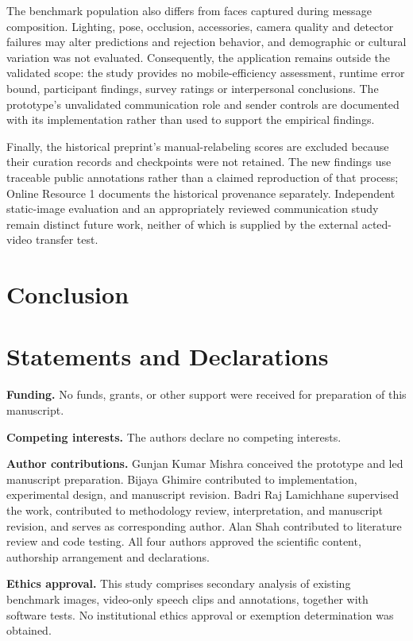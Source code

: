 \documentclass[pdflatex,sn-mathphys-num]{sn-jnl}
\begin{document}
The benchmark population also differs from faces captured during message composition. Lighting, pose, occlusion, accessories, camera quality and detector failures may alter predictions and rejection behavior, and demographic or cultural variation was not evaluated. Consequently, the application remains outside the validated scope: the study provides no mobile-efficiency assessment, runtime error bound, participant findings, survey ratings or interpersonal conclusions. The prototype's unvalidated communication role and sender controls are documented with its implementation rather than used to support the empirical findings.

Finally, the historical preprint's manual-relabeling scores are excluded because their curation records and checkpoints were not retained. The new findings use traceable public annotations rather than a claimed reproduction of that process; Online Resource 1 documents the historical provenance separately. Independent static-image evaluation and an appropriately reviewed communication study remain distinct future work, neither of which is supplied by the external acted-video transfer test.

\section{Conclusion}



\backmatter
\section*{Statements and Declarations}
\noindent\textbf{Funding.} No funds, grants, or other support were received for preparation of this manuscript.

\noindent\textbf{Competing interests.} The authors declare no competing interests.

\noindent\textbf{Author contributions.} Gunjan Kumar Mishra conceived the prototype and led manuscript preparation. Bijaya Ghimire contributed to implementation, experimental design, and manuscript revision. Badri Raj Lamichhane supervised the work, contributed to methodology review, interpretation, and manuscript revision, and serves as corresponding author. Alan Shah contributed to literature review and code testing. All four authors approved the scientific content, authorship arrangement and declarations.

\noindent\textbf{Ethics approval.} This study comprises secondary analysis of existing benchmark images, video-only speech clips and annotations, together with software tests. No institutional ethics approval or exemption determination was obtained.
\end{document}
